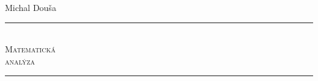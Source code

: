 \begin{titlepage}
    \hfill
    \vfill
    \raggedleft
    {\Large Michal Douša}
    \\[1cm] \hrule \hfill \\
    {\fontsize{52pt}{52pt}\selectfont \scshape Matematická\\analýza}
    \\[1.5cm] \hrule
    \vfill
\end{titlepage}